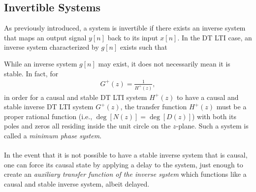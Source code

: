 \documentclass{report}
\begin{document}
\subsection{Invertible Systems}
As previously introduced, a system is invertible if there exists an inverse system that maps an output signal $y[n]$ back to its input $x[n]$. In the DT LTI case, 
an inverse system characterized by $g[n]$ exists such that 
\begin{center}
\end{center}
\begin{center}
\end{center}
While an inverse system $g[n]$ may exist, it does not necessarily mean it is stable. In fact, for 
\begin{align}
    G^+(z) = \frac{1}{H^+(z)},
\end{align}
in order for a causal and stable DT LTI system $H^+(z)$ to have a causal and stable inverse DT LTI system $G^+(z)$, the transfer function $H^+(z)$ 
must be a proper rational function (i.e., $\deg[N(z)]=\deg[D(z)]$) with both its poles and zeros all residing inside the unit circle on the $z$-plane. 
Such a system is called a \emph{minimum phase system}. 
\\ \\
In the event that it is not possible to have a stable inverse system that is causal, one can force its causal state by applying a delay to the system, just 
enough to create an \emph{auxiliary transfer function of the inverse system} which functions like a causal and stable inverse system, albeit delayed.
\end{document}
